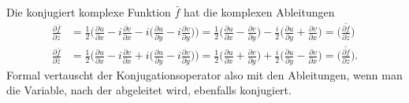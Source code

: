 Die konjugiert komplexe Funktion $\bar{f}$ hat die komplexen
Ableitungen
\begin{equation}
\begin{aligned}
\frac{\partial \bar{f}}{\partial z}
&=
\frac12
\biggl(
\frac{\partial u}{\partial x}
-
i
\frac{\partial v}{\partial x}
-
i
\biggl(
\frac{\partial u}{\partial y}
-i
\frac{\partial v}{\partial y}
\biggr)
\biggr)
=
\frac12\biggl(
\frac{\partial u}{\partial x}-\frac{\partial v}{\partial y}
\biggr)
-
\frac{i}2
\biggl(
\frac{\partial u}{\partial y}
+
\frac{\partial v}{\partial x}
\biggr)
=
\overline{\biggl(
\frac{\partial f}{\partial \bar{z}}
\biggr)}
\\
\frac{\partial \bar{f}}{\partial \bar{z}}
&=
\frac12
\biggl(
\frac{\partial u}{\partial x} - i \frac{\partial v}{\partial x}
+
i
\biggl(
\frac{\partial u}{\partial y} - i \frac{\partial v}{\partial y}
\biggr)
\biggr)
=
\frac12
\biggl(
\frac{\partial u}{\partial x}
+
\frac{\partial v}{\partial y}
\biggr)
+
\frac{i}{2}
\biggl(
\frac{\partial u}{\partial y}
-
\frac{\partial v}{\partial x}
\biggr)
=
\overline{\biggl(
\frac{\partial f}{\partial z}
\biggr)}.
\end{aligned}
\label{buch:holomorph:nichtholomorph:eqn:dkonj}
\end{equation}
Formal vertauscht der Konjugationsoperator also mit den Ableitungen,
wenn man die Variable, nach der abgeleitet wird, ebenfalls konjugiert.
